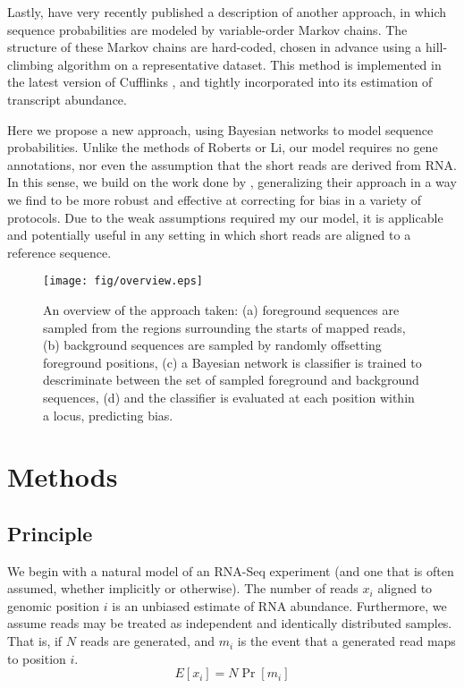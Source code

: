 \documentclass{bioinfo}
\begin{document}
Lastly, \citet{Roberts2011} have very recently published a description of
another approach, in which sequence probabilities are modeled by variable-order
Markov chains. The structure of these Markov chains are hard-coded, chosen in
advance using a hill-climbing algorithm on a representative dataset. This method
is implemented in the latest version of Cufflinks \citep{Trapnell2010}, and
tightly incorporated into its estimation of transcript abundance.

Here we propose a new approach, using Bayesian networks to model sequence
probabilities. Unlike the methods of Roberts or Li, our model requires no gene
annotations, nor even the assumption that the short reads are derived from RNA.
In this sense, we build on the work done by \citet{Hansen2010}, generalizing
their approach in a way we find to be more robust and effective at correcting
for bias in a variety of protocols. Due to the weak assumptions required my our
model, it is applicable and potentially useful in any setting in which short
reads are aligned to a reference sequence.


\begin{figure}
\centerline{\texttt{[image: fig/overview.eps]}}
\caption{An overview of the approach taken: (a) foreground sequences are sampled
from the regions surrounding the starts of mapped reads, (b) background
sequences are sampled by randomly offsetting foreground positions, (c) a
Bayesian network is classifier is trained to descriminate between the set of
sampled foreground and background sequences, (d) and the classifier is evaluated
at each position within a locus, predicting bias.}
\label{fig:overview}
\end{figure}

\section{Methods}

\subsection{Principle}

We begin with a natural model of an RNA-Seq experiment (and one that is often
assumed, whether implicitly or otherwise). The number of reads $x_i$ aligned to
genomic position $i$ is an unbiased estimate of RNA abundance. Furthermore, we
assume reads may be treated as independent and identically distributed samples.
That is, if $N$ reads are generated, and $m_i$ is the event that a generated
read maps to position $i$.
$$ E[x_i] = N \Pr[m_i] $$
\end{document}
